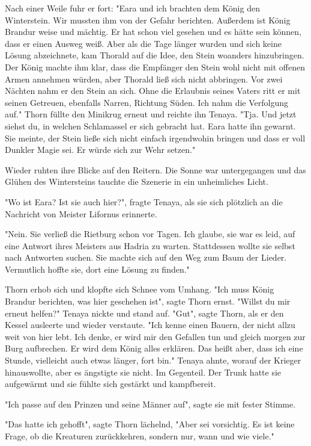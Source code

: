 \documentclass[10pt, a4paper, oneside]{book}
\begin{document}
\begin{multicols}{2}
Nach einer Weile fuhr er fort: "Eara und ich brachten dem König den Winterstein. Wir mussten ihm von der Gefahr berichten. Außerdem ist König Brandur weise und mächtig. Er hat schon viel gesehen und es hätte sein können, dass er einen Ausweg weiß. Aber als die Tage länger wurden und sich keine Lösung abzeichnete, kam Thorald auf die Idee, den Stein woanders hinzubringen. Der König machte ihm klar, dass die Empfänger den Stein wohl nicht mit offenen Armen annehmen würden, aber Thorald ließ sich nicht abbringen. Vor zwei Nächten nahm er den Stein an sich. Ohne die Erlaubnis seines Vaters ritt er mit seinen Getreuen, ebenfalls Narren, Richtung Süden. Ich nahm die Verfolgung auf." Thorn füllte den Minikrug erneut und reichte ihn Tenaya. "Tja. Und jetzt siehst du, in welchen Schlamassel er sich gebracht hat. Eara hatte ihn gewarnt. Sie meinte, der Stein ließe sich nicht einfach irgendwohin bringen und dass er voll Dunkler Magie sei. Er würde sich zur Wehr setzen."

Wieder ruhten ihre Blicke auf den Reitern. Die Sonne war untergegangen und das Glühen des Wintersteins tauchte die Szenerie in ein unheimliches Licht.  

"Wo ist Eara? Ist sie auch hier?", fragte Tenaya, als sie sich plötzlich an die Nachricht von Meister Lifornus erinnerte.

"Nein. Sie verließ die Rietburg schon vor Tagen. Ich glaube, sie war es leid, auf eine Antwort ihres Meisters aus Hadria zu warten. Stattdessen wollte sie selbst nach Antworten suchen. Sie machte sich auf den Weg zum Baum der Lieder. Vermutlich hoffte sie, dort eine Lösung zu finden."

Thorn erhob sich und klopfte sich Schnee vom Umhang. "Ich muss König Brandur berichten, was hier geschehen ist", sagte Thorn ernst. "Willst du mir erneut helfen?" Tenaya nickte und stand auf. "Gut", sagte Thorn, als er den Kessel ausleerte und wieder verstaute. "Ich kenne einen Bauern, der nicht allzu weit von hier lebt. Ich denke, er wird mir den Gefallen tun und gleich morgen zur Burg aufbrechen. Er wird dem König alles erklären. Das heißt aber, dass ich eine Stunde, vielleicht auch etwas länger, fort bin." Tenaya ahnte, worauf der Krieger hinauswollte, aber es ängstigte sie nicht. Im Gegenteil. Der Trunk hatte sie aufgewärmt und sie fühlte sich gestärkt und kampfbereit. 

"Ich passe auf den Prinzen und seine Männer auf", sagte sie mit fester Stimme.

"Das hatte ich gehofft", sagte Thorn lächelnd, "Aber sei vorsichtig. Es ist keine Frage, ob die Kreaturen zurückkehren, sondern nur, wann und wie viele."


\end{multicols}
\end{document}
